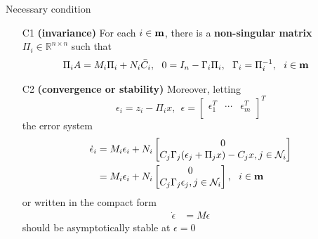 \documentclass{beamer}
\newcommand{\R}{\mathbb{R}}
\begin{document}
\begin{frame}{\color{blue} Necessary condition}


\begin{itemize}
  \item [C1] \textbf{(invariance)} For each $i\in{\bf m}$, there is a \textbf{non-singular matrix} $\Pi_{i}\in\R^{n\times n}$ such that
\begin{align*}
\Pi_{i}A&=M_{i}\Pi_{i}+ N_{i}\bar{C}_{i},~~ 0=I_{n}-\Gamma_{i}\Pi_{i},~~ \Gamma_{i}=\Pi_{i}^{-1},~~ i\in{\bf m}
\end{align*}
  \item [C2] \textbf{(convergence or stability)} Moreover, letting
\begin{equation*}
\epsilon_{i}=z_{i}-\Pi_{i}x,~~ \epsilon=\begin{bmatrix} \epsilon_{1}^{T} & \cdots & \epsilon_{m}^{T} \\ \end{bmatrix}^{T}
\end{equation*}
the error system
\begin{align*}
\dot{\epsilon}_{i}%
&=M_{i}\epsilon_{i} +N_{i}\begin{bmatrix} 0 \\ C_{j} \Gamma_{j}(\epsilon_{j}+\Pi_{j}x)-C_{j}x,j\in\mathcal{N}_{i} \\ \end{bmatrix} \\
&=M_{i}\epsilon_{i} +N_{i}\begin{bmatrix} 0 \\ C_{j} \Gamma_{j}\epsilon_{j},j\in\mathcal{N}_{i} \\ \end{bmatrix},~~ i\in{\bf m}
\end{align*}
or written in the compact form
\begin{align*}
\dot{\epsilon}&=M \epsilon
\end{align*}
should be asymptotically stable at $\epsilon=0$
\end{itemize}
\end{frame}
\end{document}
